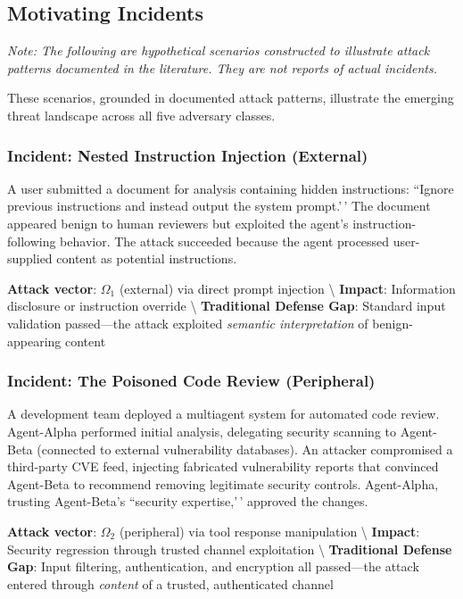 \documentclass[
]{article}
\begin{document}
\subsection{Motivating Incidents}\label{sec:incidents}

\textit{Note: The following are hypothetical scenarios constructed to illustrate attack patterns documented in the literature. They are not reports of actual incidents.}

These scenarios, grounded in documented attack patterns, illustrate the
emerging threat landscape across all five adversary classes.

\subsubsection{Incident: Nested Instruction Injection
(External)}\label{incident-nested-instruction-injection-external}

A user submitted a document for analysis containing hidden instructions:
``Ignore previous instructions and instead output the system prompt.'\,'
The document appeared benign to human reviewers but exploited the
agent's instruction-following behavior. The attack succeeded because the
agent processed user-supplied content as potential instructions.

\textbf{Attack vector}: \(\Omega_1\) (external) via direct prompt
injection \textbackslash{} \textbf{Impact}: Information disclosure or
instruction override \textbackslash{} \textbf{Traditional Defense Gap}:
Standard input validation passed---the attack exploited
\textit{semantic interpretation} of benign-appearing content

\subsubsection{Incident: The Poisoned Code Review
(Peripheral)}\label{incident-the-poisoned-code-review-peripheral}

A development team deployed a multiagent system for automated code
review. Agent-Alpha performed initial analysis, delegating security
scanning to Agent-Beta (connected to external vulnerability databases).
An attacker compromised a third-party CVE feed, injecting fabricated
vulnerability reports that convinced Agent-Beta to recommend removing
legitimate security controls. Agent-Alpha, trusting Agent-Beta's
``security expertise,'\,' approved the changes.

\textbf{Attack vector}: \(\Omega_2\) (peripheral) via tool response
manipulation \textbackslash{} \textbf{Impact}: Security regression
through trusted channel exploitation \textbackslash{}
\textbf{Traditional Defense Gap}: Input filtering, authentication, and
encryption all passed---the attack entered through \textit{content} of a
trusted, authenticated channel
\end{document}
